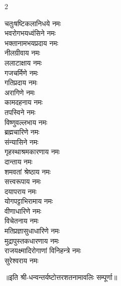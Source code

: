 \begin{multicols}{2}
\begin{flushleft}
चतुःषष्टिकलानिधये नमः\\
भवरोगभयध्वंसिने नमः\\
भक्तानामभयप्रदाय नमः\\
नीलग्रीवाय नमः\\
ललाटाक्षाय नमः\\
गजचर्मिणे नमः\\
गतिप्रदाय नमः \hfill {}\\
अरागिणे नमः\\
कामदहनाय नमः\\
तपस्विने नमः\\
विष्णुवल्लभाय नमः\\
ब्रह्मचारिणे नमः\\
संन्यासिने नमः\\
गृहस्थाश्रमकारणाय नमः\\
दान्ताय नमः\\
शमवतां श्रेष्ठाय नमः\\
सत्त्वरूपाय नमः \hfill {}\\
दयापराय नमः\\
योगपट्टाभिरामाय नमः\\
वीणाधारिणे नमः\\
विचेतनाय नमः\\
मतिप्रज्ञासुधाधारिणे नमः\\
मुद्रापुस्तकधारणाय नमः\\
राजयक्ष्मादिरोगाणां विनिहन्त्रे नमः\\
सुरेश्वराय नमः \hfill {}\\
\end{flushleft}
\end{multicols}
॥इति श्री-धन्वन्तर्यष्टोत्तरशतनामावलिः सम्पूर्णा॥
